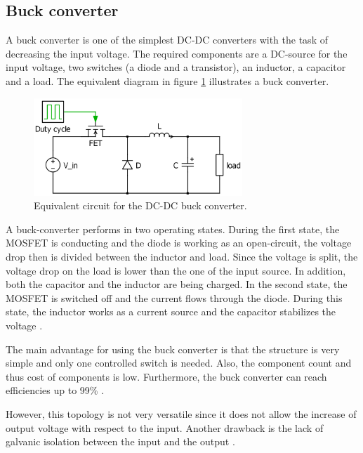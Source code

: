 \subsection{Buck converter\label{Buck-C}}

A buck converter is one of the simplest DC-DC converters with the task of decreasing the input voltage. The required components are a DC-source for the input voltage, two switches (a diode and a transistor), an inductor, a capacitor and a load. The equivalent diagram in figure \ref{Buck-converter} illustrates a buck converter. 

\begin{figure}[htbp]
	\begin{center}
		\includegraphics[width=0.7\textwidth]{../Pictures/Buck-converter}
		\caption{Equivalent circuit for the DC-DC buck converter.}
		\label{Buck-converter}
	\end{center}	
\end{figure}

A buck-converter performs in two operating states. 
During the first state, the MOSFET is conducting and the diode is working as an open-circuit, the voltage drop  then is divided between the inductor and load. Since the voltage is split, the voltage drop on the load is lower than the one of the input source. In addition, both the capacitor and the inductor are being charged. In the second state, the MOSFET is switched off and the current flows through the diode. During this state, the inductor works as a current source and the capacitor stabilizes the voltage \cite{schematicbuckandboost}.

The main advantage for using the buck converter is that the structure is very simple and only one controlled  switch is needed. Also, the component count and thus cost of components is low. Furthermore, the buck converter can reach efficiencies up to 99\% \cite{Efficiencybuck}. 

However, this topology is not very versatile since it does not allow the increase of output voltage with respect to the input. Another drawback is the lack of galvanic isolation between the input and the output \cite{advantagebuck}.

